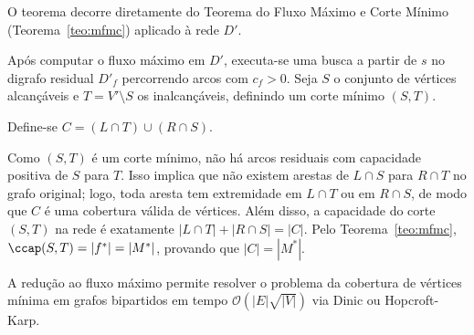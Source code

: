 \begin{demonstracao}
O teorema decorre diretamente do Teorema do Fluxo Máximo e Corte Mínimo (Teorema~\ref{teo:mfmc}) aplicado à rede $D'$.

Após computar o fluxo máximo em $D'$, executa-se uma busca a partir de $s$ no digrafo residual $D'_f$ percorrendo arcos com $c_f > 0$. Seja $S$ o conjunto de vértices alcançáveis e $T = V' \setminus S$ os inalcançáveis, definindo um corte mínimo $(S, T)$.

Define-se $C = (L \cap T) \cup (R \cap S)$.

Como $(S, T)$ é um corte mínimo, não há arcos residuais com capacidade positiva de $S$ para $T$. Isso implica que não existem arestas de $L \cap S$ para $R \cap T$ no grafo original; logo, toda aresta tem extremidade em $L \cap T$ ou em $R \cap S$, de modo que $C$ é uma cobertura válida de vértices. Além disso, a capacidade do corte $(S, T)$ na rede é exatamente $|L \cap T| + |R \cap S| = |C|$. Pelo Teorema~\ref{teo:mfmc}, $\ccap(S, T) = |f^*| = |M^*|$, provando que $|C| = |M^*|$.
\end{demonstracao}

 A redução ao fluxo máximo permite resolver o problema da cobertura de vértices mínima em grafos bipartidos em tempo $\mathcal{O}(|E|\sqrt{|V|})$ via Dinic ou Hopcroft-Karp.

